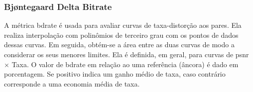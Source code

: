 \subsubsection{Bj{\o}ntegaard Delta Bitrate}

A métrica \gls{bdrate} \cite{bjontegaard2008improvements} é usada para avaliar curvas de taxa-distorção aos pares. Ela realiza interpolação com polinômios de terceiro grau com os pontos de dados dessas curvas. Em seguida, obtém-se a área entre as duas curvas de modo a considerar os seus menores limites.  Ela é definida, em geral, para curvas de \acrshort{psnr} $\times$ Taxa. 
O valor de \acrshort{bdrate} em relação ao uma referência (âncora) é dado em porcentagem. Se positivo indica um ganho médio de taxa, caso contrário corresponde a uma economia média de taxa. 




